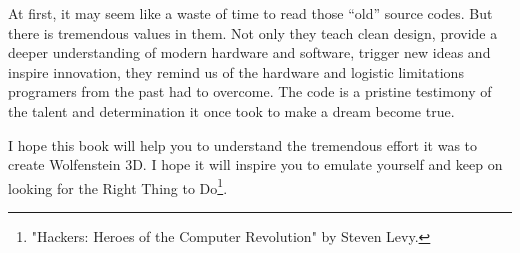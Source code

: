 \documentclass[book.tex]{subfiles}
\begin{document}
\bigskip

At first, it may seem like a waste of time to read those ``old'' source codes. But there is tremendous values in them. Not only they teach clean design, provide a deeper understanding of modern hardware and software, trigger new ideas and inspire innovation, they remind us of the hardware and logistic limitations programers from the past had to overcome. The code is a pristine testimony of the talent and determination it once took to make a dream become true.
\bigskip

I hope this book will help you to understand the tremendous effort it was to create Wolfenstein 3D. I hope it will inspire you to emulate yourself and keep on looking for the Right Thing to Do\footnote{"Hackers: Heroes of the Computer Revolution" by Steven Levy.}.
\end{document}

